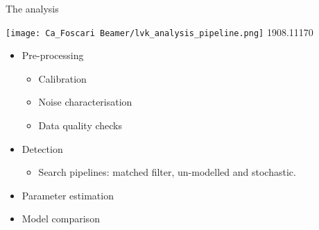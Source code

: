\documentclass[aspectratio=169, 11pt]{beamer}
\begin{document}
\begin{frame}{The analysis}
\begin{minipage}{0.6\textwidth}
\vspace{1cm}
    \texttt{[image: Ca\_Foscari Beamer/lvk\_analysis\_pipeline.png]}
    \tiny 1908.11170
\end{minipage}\hfill
\begin{minipage}{0.3\textwidth}\vspace{0.5cm}
    \begin{itemize}
        \item Pre-processing
            \begin{itemize}
                \item Calibration
                \item Noise characterisation
                \item Data quality checks
            \end{itemize}
        \item Detection
            \begin{itemize}
                \item Search pipelines: matched filter, un-modelled and stochastic.
            \end{itemize}
        \item Parameter estimation
        \item Model comparison
    \end{itemize}
\end{minipage}
\end{frame}
\end{document}
